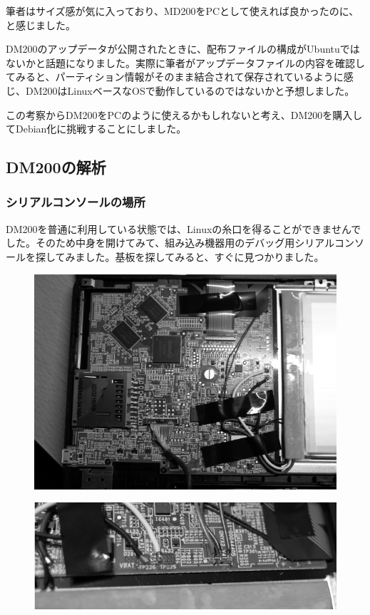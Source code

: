 \documentclass[mingoth,a4paper]{jsarticle}
\begin{document}
筆者はサイズ感が気に入っており、MD200をPCとして使えれば良かったのに、と感じました。

DM200のアップデータが公開されたときに、配布ファイルの構成がUbuntuではないかと話題になりました。実際に筆者がアップデータファイルの内容を確認してみると、パーティション情報がそのまま結合されて保存されているように感じ、DM200はLinuxベースなOSで動作しているのではないかと予想しました。

この考察からDM200をPCのように使えるかもしれないと考え、DM200を購入してDebian化に挑戦することにしました。


\subsection{DM200の解析}

\subsubsection{シリアルコンソールの場所}

DM200を普通に利用している状態では、Linuxの糸口を得ることができませんでした。そのため中身を開けてみて、組み込み機器用のデバッグ用シリアルコンソールを探してみました。基板を探してみると、すぐに見つかりました。

\begin{figure}[h]
  \begin{center}
    \includegraphics[scale=0.5]{image201709/dm200_board_gray.png}
  \end{center}
\end{figure}


\begin{figure}[h]
  \begin{center}
    \includegraphics[scale=0.5]{image201709/dm200_board_serialconsole_gray.png}
  \end{center}
\end{figure}
\end{document}
